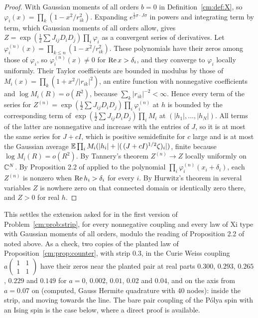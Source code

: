 \begin{proof}
With Gaussian moments of all orders $b=0$ in Definition~\ref{cm:def:X}, so $\varphi_i(x)=\prod_k(1-x^2/r_{ik}^2)$. Expanding $e^{\frac12\sigma\cdot J\sigma}$ in powers and integrating term by term, which Gaussian moments of all orders allow, gives $Z=\exp(\frac12\sum J_{ij}D_iD_j)\prod_i\varphi_i$ as a convergent series of derivatives. Let $\varphi_i^{(n)}(x)=\prod_{k\le n}(1-x^2/r_{ik}^2)$. These polynomials have their zeros among those of $\varphi_i$, so $\varphi_i^{(n)}(x)\ne0$ for $\operatorname{Re} x>\delta_i$, and they converge to $\varphi_i$ locally uniformly. Their Taylor coefficients are bounded in modulus by those of $M_i(x)=\prod_k(1+x^2/|r_{ik}|^2)$, an entire function with nonnegative coefficients and $\log M_i(R)=o(R^2)$, because $\sum_k|r_{ik}|^{-2}<\infty$. Hence every term of the series for $Z^{(n)}=\exp(\frac12\sum J_{ij}D_iD_j)\prod_i\varphi_i^{(n)}$ at $h$ is bounded by the corresponding term of $\exp(\frac12\sum J_{ij}D_iD_j)\prod_iM_i$ at $(|h_1|,\dots,|h_N|)$. All terms of the latter are nonnegative and increase with the entries of $J$, so it is at most the same series for $J+cI$, which is positive semidefinite for $c$ large and is at most the Gaussian average $\mathbb{E}\prod_iM_i(|h_i|+|(\,(J+cI)^{1/2}\zeta)_i|)$, finite because $\log M_i(R)=o(R^2)$. By Tannery's theorem $Z^{(n)}\to Z$ locally uniformly on $\mathbb{C}^N$. By Proposition 2.2 of \cite{LiebSokal81} applied to the polynomial $\prod_i\varphi_i^{(n)}(x_i+\delta_i)$, each $Z^{(n)}$ is nonzero when $\operatorname{Re} h_i>\delta_i$ for every $i$. By Hurwitz's theorem in several variables $Z$ is nowhere zero on that connected domain or identically zero there, and $Z>0$ for real $h$.
\end{proof}

This settles the extension asked for in the first version of Problem~\ref{cm:prob:strip}, for every nonnegative coupling and every law of Xi type with Gaussian moments of all orders, modulo the reading of Proposition 2.2 of \cite{LiebSokal81} noted above. As a check, two copies of the planted law of Proposition~\ref{cm:prop:counter}, with strip $0.3$, in the Curie Weiss coupling $a\begin{pmatrix}1&1\\1&1\end{pmatrix}$ have their zeros near the planted pair at real parts $0.300$, $0.293$, $0.265$, $0.229$ and $0.149$ for $a=0$, $0.002$, $0.01$, $0.02$ and $0.04$, and on the axis from $a=0.07$ on (computed, Gauss Hermite quadrature with 40 nodes): inside the strip, and moving towards the line. The bare pair coupling of the P\'olya spin with an Ising spin is the case below, where a direct proof is available.

